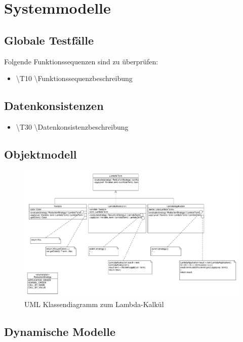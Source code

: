 \section{Systemmodelle}

\subsection{Globale Testfälle}
Folgende Funktionssequenzen sind zu überprüfen:

\begin{itemize}
\item \textbackslash T10 \textbackslash Funktionssequenzbeschreibung
\end{itemize}

\subsection{Datenkonsistenzen}

\begin{itemize}
\item \textbackslash T30 \textbackslash Datenkonsistenzbeschreibung
\end{itemize}

\subsection{Objektmodell}

\begin{figure}[h]
\centering
\includegraphics[scale=0.35]{../system_models/object_models/lambda_calculus.pdf}
\caption{UML Klassendiagramm zum Lambda-Kalkül}
\end{figure}

\subsection{Dynamische Modelle}

